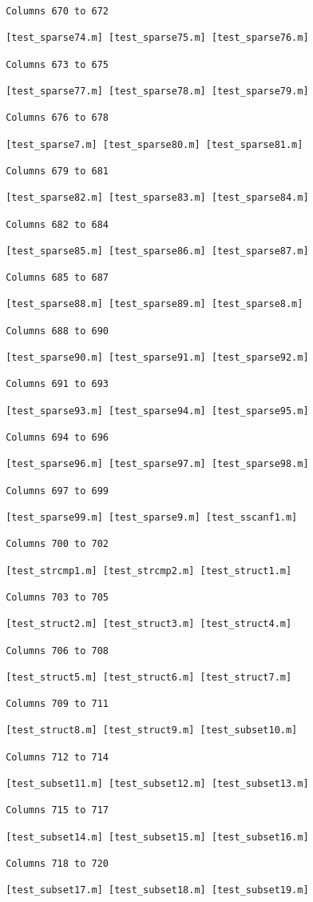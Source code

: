 \begin{verbatim}
 Columns 670 to 672

 [test_sparse74.m] [test_sparse75.m] [test_sparse76.m] 

 Columns 673 to 675

 [test_sparse77.m] [test_sparse78.m] [test_sparse79.m] 

 Columns 676 to 678

 [test_sparse7.m] [test_sparse80.m] [test_sparse81.m] 

 Columns 679 to 681

 [test_sparse82.m] [test_sparse83.m] [test_sparse84.m] 

 Columns 682 to 684

 [test_sparse85.m] [test_sparse86.m] [test_sparse87.m] 

 Columns 685 to 687

 [test_sparse88.m] [test_sparse89.m] [test_sparse8.m] 

 Columns 688 to 690

 [test_sparse90.m] [test_sparse91.m] [test_sparse92.m] 

 Columns 691 to 693

 [test_sparse93.m] [test_sparse94.m] [test_sparse95.m] 

 Columns 694 to 696

 [test_sparse96.m] [test_sparse97.m] [test_sparse98.m] 

 Columns 697 to 699

 [test_sparse99.m] [test_sparse9.m] [test_sscanf1.m] 

 Columns 700 to 702

 [test_strcmp1.m] [test_strcmp2.m] [test_struct1.m] 

 Columns 703 to 705

 [test_struct2.m] [test_struct3.m] [test_struct4.m] 

 Columns 706 to 708

 [test_struct5.m] [test_struct6.m] [test_struct7.m] 

 Columns 709 to 711

 [test_struct8.m] [test_struct9.m] [test_subset10.m] 

 Columns 712 to 714

 [test_subset11.m] [test_subset12.m] [test_subset13.m] 

 Columns 715 to 717

 [test_subset14.m] [test_subset15.m] [test_subset16.m] 

 Columns 718 to 720

 [test_subset17.m] [test_subset18.m] [test_subset19.m] 


\end{verbatim}
